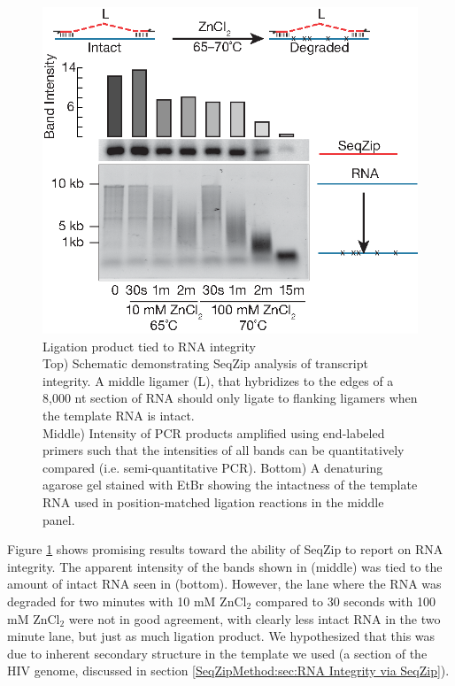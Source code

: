 	  \begin{figure} %
    	\centering 
    	\includegraphics{Figures/SeqZipMethod/DegreadedRNABySeqZip.eps}
    	\caption[Ligation product tied to RNA integrity]
    	{
		    Ligation product tied to RNA integrity\\[0.25cm]
      	Top) Schematic demonstrating SeqZip analysis of transcript integrity. A middle ligamer (L), that hybridizes to the edges of a 8,000 nt section of RNA should only ligate to flanking ligamers when the template RNA is intact. \\
        Middle) Intensity of PCR products amplified using end-labeled primers such that the intensities of all bands can be quantitatively compared (i.e. semi-quantitative PCR). Bottom) A denaturing agarose gel stained with EtBr showing the intactness of the template RNA used in position-matched ligation reactions in the middle panel.
    		}
    	\label{SeqZipMethod:fig:Ligation product and RNA integrity}
  		\end{figure}

    Figure \ref{SeqZipMethod:fig:Ligation product and RNA integrity} shows promising results toward the ability of SeqZip to report on RNA integrity. The apparent intensity of the bands shown in (middle) was tied to the amount of intact RNA seen in (bottom). However, the lane where the RNA was degraded for two minutes with 10 mM ZnCl$_{2}$ compared to 30 seconds with 100 mM ZnCl$_{2}$ were not in good agreement, with clearly less intact RNA in the two minute lane, but just as much ligation product. We hypothesized that this was due to inherent secondary structure in the template we used (a section of the HIV genome, discussed in section \ref{SeqZipMethod:sec:RNA Integrity via SeqZip}). 

